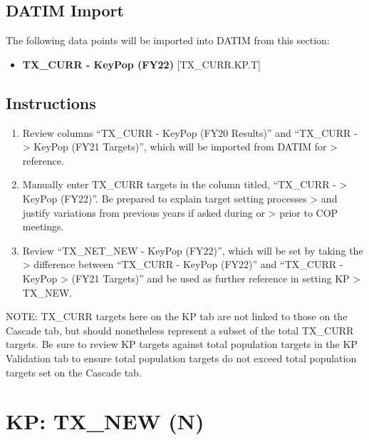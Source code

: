 \documentclass[
  openany]{book}
\providecommand{\tightlist}{%
  \setlength{\itemsep}{0pt}\setlength{\parskip}{0pt}}
\begin{document}
\hypertarget{datim-import-47}{%
\subsection{DATIM Import}\label{datim-import-47}}

The following data points will be imported into DATIM from this section:

\begin{itemize}
\tightlist
\item
  \textbf{TX\_CURR - KeyPop (FY22)} {[}TX\_CURR.KP.T{]}
\end{itemize}

\hypertarget{instructions-47}{%
\subsection{Instructions}\label{instructions-47}}

\begin{enumerate}
\def\labelenumi{\arabic{enumi}.}
\item
  Review columns ``TX\_CURR - KeyPop (FY20 Results)'' and ``TX\_CURR -
  \textgreater{} KeyPop (FY21 Targets)'', which will be imported from DATIM for
  \textgreater{} reference.
\item
  Manually enter TX\_CURR targets in the column titled, ``TX\_CURR -
  \textgreater{} KeyPop (FY22)''. Be prepared to explain target setting processes
  \textgreater{} and justify variations from previous years if asked during or
  \textgreater{} prior to COP meetings.
\item
  Review ``TX\_NET\_NEW - KeyPop (FY22)'', which will be set by taking the
  \textgreater{} difference between ``TX\_CURR - KeyPop (FY22)'' and ``TX\_CURR - KeyPop
  \textgreater{} (FY21 Targets)'' and be used as further reference in setting KP
  \textgreater{} TX\_NEW.
\end{enumerate}

NOTE: TX\_CURR targets here on the KP tab are not linked to those on the
Cascade tab, but should nonetheless represent a subset of the total
TX\_CURR targets. Be sure to review KP targets against total population
targets in the KP Validation tab to ensure total population targets do
not exceed total population targets set on the Cascade tab.

\hypertarget{kp-tx_new-n}{%
\section{KP: TX\_NEW (N)}\label{kp-tx_new-n}}
\end{document}
